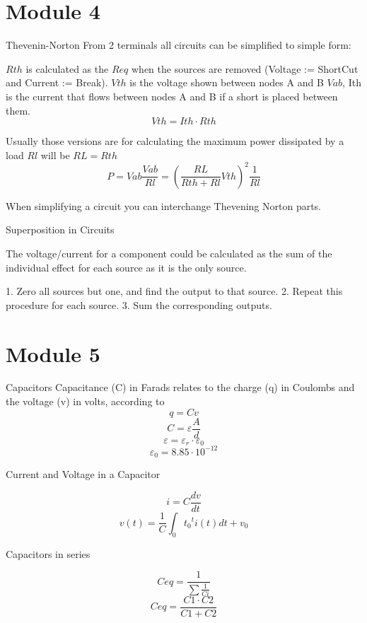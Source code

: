 \documentclass[]{article}
\begin{document}
\section{Module 4}
Thevenin-Norton
From 2 terminals all circuits can be simplified to simple form:


$Rth$ is calculated as the $Req$ when the sources are removed (Voltage := ShortCut and Current := Break). $Vth$ is the voltage shown between nodes A and B $Vab$, Ith is the current that flows between nodes A and B if a short is placed between them.
$$Vth=Ith\cdot Rth$$

Usually those versions are for calculating the maximum power dissipated by a load $Rl$ will be $RL=Rth$
$$P=Vab\frac{Vab}{Rl}=\left(\frac{RL}{Rth+Rl}Vth\right)^2 \frac{1}{Rl}$$

When simplifying a circuit you can interchange Thevening Norton parts.

Superposition in Circuits

The voltage/current for a component could be calculated as the sum of the individual effect for each source as it is the only source.

1. Zero all sources but one, and find the
output to that source.
2. Repeat this procedure for each source.
3. Sum the corresponding outputs.

\section{Module 5}
Capacitors
Capacitance (C) in Farads relates to the charge (q) in Coulombs and the voltage (v) in volts, according to
$$q=Cv$$
$$C=\varepsilon\frac{A}{d}$$
$$\varepsilon=\varepsilon_r\cdot\varepsilon_0$$
$$\varepsilon_0=8.85\cdot 10^{-12}$$

Current and Voltage in a Capacitor

$$i=C\frac{dv}{dt}$$
$$v(t)=\frac{1}{C}\int_0{t_0}^{t}{i(t)dt}+v_0$$	

Capacitors in series

$$Ceq=\frac{1}{\sum\frac{1}{Ci}}$$
$$Ceq=\frac{C1\cdot C2}{C1+C2}$$
\end{document}
